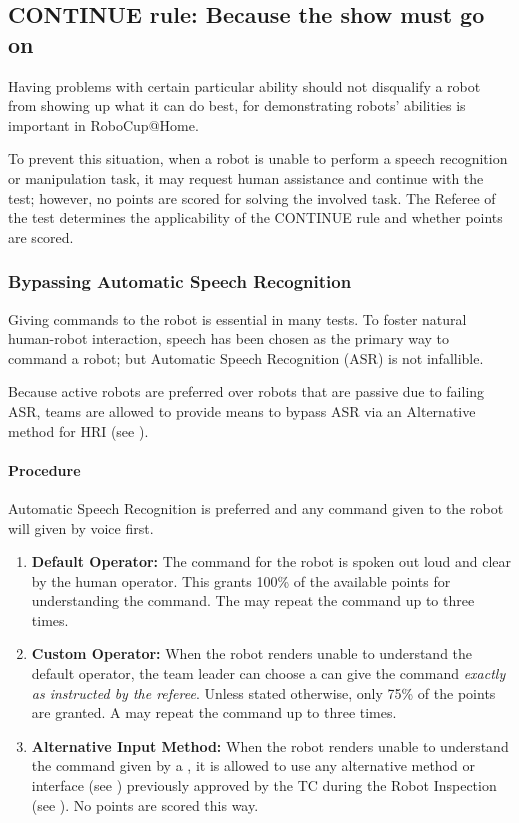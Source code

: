 \subsection{CONTINUE rule: Because the show must go on}
\label{rule:continue}
Having problems with certain particular ability should not disqualify a robot from showing up what it can do best, for demonstrating robots' abilities is important in RoboCup@Home.

To prevent this situation, when a robot is unable to perform a
speech recognition
or manipulation
task, it may request human assistance and continue with the test; however, no points are scored for solving the involved task. The Referee of the test determines the applicability of the CONTINUE rule and whether points are scored.

\subsubsection{Bypassing Automatic Speech Recognition}
\label{rule:asrcontinue}
Giving commands to the robot is essential in many tests. To foster natural human-robot interaction, speech has been chosen as the primary way to command a robot; but Automatic Speech Recognition (ASR) is not infallible.

Because active robots are preferred over robots that are passive due to failing ASR, teams are allowed to provide means to bypass ASR via an Alternative method for HRI (see ).

\paragraph{Procedure}
Automatic Speech Recognition is preferred and any command given to the robot will given by voice first.
\begin{enumerate}
	\item \textbf{Default Operator:} The command for the robot is spoken out loud and clear by the human operator. This grants 100\% of the available points for understanding the command. The  may repeat the command up to three times.

	\item \textbf{Custom Operator:} When the robot renders unable to understand the default operator, the team leader can choose a  can give the command \emph{exactly as instructed by the referee}. Unless stated otherwise, only 75\% of the points are granted. A  may repeat the command up to three times.

	\item \textbf{Alternative Input Method:} When the robot renders unable to understand the command given by a , it is allowed to use any alternative method or interface (see ) previously approved by the TC during the Robot Inspection (see ). No points are scored this way.
\end{enumerate}


